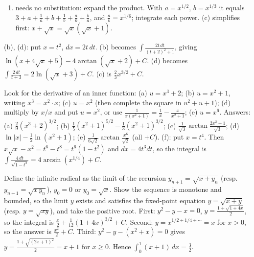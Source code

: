 \documentclass[11pt,a4paper]{article}
\begin{document}
\begin{enumerate}
\def\labelenumi{(\alph{enumi})}
\tightlist
\item
  needs no substitution: expand the product. With \(a=x^{1/2}\), \(b=x^{1/3}\) it equals \(3+a+\frac1a+b+\frac1b+\frac ab+\frac ba\), and \(\frac ab=x^{1/6}\); integrate each power. (c) simplifies first: \(x+\sqrt x=\sqrt x(\sqrt x+1)\).
\end{enumerate}
(b), (d): put \(x=t^2\), \(dx=2t\,dt\). (b) becomes \(\int\frac{2t\,dt}{(t+2)^2+1}\), giving \(\ln(x+4\sqrt x+5)-4\arctan(\sqrt x+2)+C\). (d) becomes \(\int\frac{2\,dt}{t+3}=2\ln(\sqrt x+3)+C\). (c) is \(\frac23x^{3/2}+C\).

Look for the derivative of an inner function: (a) \(u=x^3+2\); (b) \(u=x^2+1\), writing \(x^3=x^2\cdot x\); (c) \(u=x^2\) (then complete the square in \(u^2+u+1\)); (d) multiply by \(x/x\) and put \(u=x^2\), or use \(\frac1{x(x^2+1)}=\frac1x-\frac x{x^2+1}\); (e) \(u=x^6\).
Answers: (a) \(\frac29(x^3+2)^{3/2}\); (b) \(\frac15(x^2+1)^{5/2}-\frac13(x^2+1)^{3/2}\); (c) \(\frac1{\sqrt3}\arctan\frac{2x^2+1}{\sqrt3}\); (d) \(\ln\lvert x\rvert-\frac12\ln(x^2+1)\); (e) \(\frac1{6\sqrt2}\arctan\frac{x^6}{\sqrt2}\) (all \(+C\)).
(f): put \(x=t^4\). Then \(x\sqrt x-x^2=t^6-t^8=t^6(1-t^2)\) and \(dx=4t^3dt\), so the integral is \(\int\frac{4\,dt}{\sqrt{1-t^2}}=4\arcsin(x^{1/4})+C\).

Define the infinite radical as the limit of the recursion \(y_{n+1}=\sqrt{x+y_n}\) (resp. \(y_{n+1}=\sqrt{x\,y_n}\)), \(y_0=0\) or \(y_0=\sqrt x\). Show the sequence is monotone and bounded, so the limit \(y\) exists and satisfies the fixed-point equation \(y=\sqrt{x+y}\) (resp. \(y=\sqrt{xy}\)), and take the positive root.
First: \(y^2-y-x=0\), \(y=\frac{1+\sqrt{1+4x}}2\), so the integral is \(\frac x2+\frac1{12}(1+4x)^{3/2}+C\). Second: \(y=x^{1/2+1/4+\cdots}=x\) for \(x\gt 0\), so the answer is \(\frac{x^2}2+C\).
Third: \(y^2-y-(x^2+x)=0\) gives \(y=\frac{1+\sqrt{(2x+1)^2}}{2}=x+1\) for \(x\ge 0\). Hence \(\int_0^1(x+1)\,dx=\frac32\).
\end{document}
